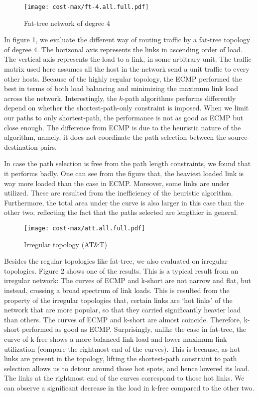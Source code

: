 \documentclass[conference]{IEEEtran}
\begin{document}
\begin{figure}
\centering\texttt{[image: cost-max/ft-4.all.full.pdf]}
\caption{Fat-tree network of degree 4}
\end{figure}

In figure 1, we evaluate the different way of routing traffic by a fat-tree
topology of degree 4. The horizonal axis represents the links in ascending
order of load. The vertical axis represents the load to a link, in some
arbitrary unit. The traffic matrix used here assumes all the host in the
network send a unit traffic to every other hosts. Because of the highly regular
topology, the ECMP performed the best in terms of both load balancing and
minimizing the maximum link load across the network. Interestingly, the
$k$-path algorithms performs differently depend on whether the
shortest-path-only constraint is imposed. When we limit our paths to only
shortest-path, the performance is not as good as ECMP but close enough. The
difference from ECMP is due to the heuristic nature of the algorithm, namely,
it does not coordinate the path selection between the source-destination pairs.

In case the path selection is free from the path length constraints, we found
that it performs badly. One can see from the figure that, the heaviest loaded
link is way more loaded than the case in ECMP. Moreover, some links are under
utilized. These are resulted from the inefficiency of the heuristic algorithm.
Furthermore, the total area under the curve is also larger in this case than
the other two, reflecting the fact that the paths selected are lengthier in
general.

\begin{figure}
\centering\texttt{[image: cost-max/att.all.full.pdf]}
\caption{Irregular topology (AT\&T)}
\end{figure}

Besides the regular topologies like fat-tree, we also evaluated on irregular
topologies. Figure 2 shows one of the results. This is a typical result from an
irregular network: The curves of ECMP and k-short are not narrow and flat, but
instead, crossing a broad spectrum of link loads. This is resulted from the
property of the irregular topologies that, certain links are `hot links' of the
network that are more popular, so that they carried significantly heavier load
than others. The curves of ECMP and k-short are almost coincide. Therefore,
k-short performed as good as ECMP. Surprisingly, unlike the case in fat-tree,
the curve of k-free shows a more balanced link load and lower maximum link
utilization (compare the rightmost end of the curves). This is because, as hot
links are present in the topology, lifting the shortest-path constraint to path
selection allows us to detour around those hot spots, and hence lowered its
load. The links at the rightmost end of the curves correspond to those hot
links. We can observe a significant decrease in the load in k-free compared to
the other two.
\end{document}
